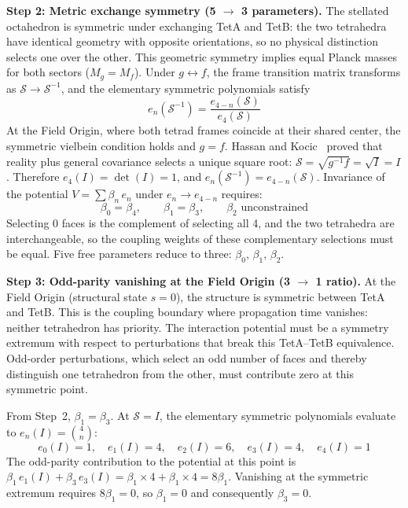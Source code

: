 \documentclass[aps,prd,preprint,superscriptaddress,showpacs,preprintnumbers,amsmath,amssymb,nofootinbib]{revtex4-2}
\begin{document}
\textbf{Step 2: Metric exchange symmetry (5 $\to$ 3 parameters).} The stellated octahedron is symmetric under exchanging TetA and TetB: the two tetrahedra have identical geometry with opposite orientations, so no physical distinction selects one over the other. This geometric symmetry implies equal Planck masses for both sectors ($M_g = M_f$). Under $g \leftrightarrow f$, the frame transition matrix transforms as $\mathcal{S} \to \mathcal{S}^{-1}$, and the elementary symmetric polynomials satisfy
\begin{equation}
e_n(\mathcal{S}^{-1}) = \frac{e_{4-n}(\mathcal{S})}{e_4(\mathcal{S})}
\end{equation}
At the Field Origin, where both tetrad frames coincide at their shared center, the symmetric vielbein condition holds and $g = f$. Hassan and Kocic~\cite{hassankocic2018} proved that reality plus general covariance selects a unique square root: $\mathcal{S} = \sqrt{g^{-1}f} = \sqrt{I} = I$. Therefore $e_4(I) = \det(I) = 1$, and $e_n(\mathcal{S}^{-1}) = e_{4-n}(\mathcal{S})$. Invariance of the potential $V = \sum \beta_n\,e_n$ under $e_n \to e_{4-n}$ requires:
\begin{equation}
\beta_0 = \beta_4, \qquad \beta_1 = \beta_3, \qquad \beta_2 \text{ unconstrained}
\end{equation}
Selecting 0 faces is the complement of selecting all 4, and the two tetrahedra are interchangeable, so the coupling weights of these complementary selections must be equal. Five free parameters reduce to three: $\beta_0$, $\beta_1$, $\beta_2$.

\textbf{Step 3: Odd-parity vanishing at the Field Origin (3 $\to$ 1 ratio).} At the Field Origin (structural state $s = 0$), the structure is symmetric between TetA and TetB. This is the coupling boundary where propagation time vanishes: neither tetrahedron has priority. The interaction potential must be a symmetry extremum with respect to perturbations that break this TetA--TetB equivalence. Odd-order perturbations, which select an odd number of faces and thereby distinguish one tetrahedron from the other, must contribute zero at this symmetric point.

From Step~2, $\beta_1 = \beta_3$. At $\mathcal{S} = I$, the elementary symmetric polynomials evaluate to $e_n(I) = \binom{4}{n}$:
\begin{equation}
e_0(I) = 1, \quad e_1(I) = 4, \quad e_2(I) = 6, \quad e_3(I) = 4, \quad e_4(I) = 1
\end{equation}
The odd-parity contribution to the potential at this point is $\beta_1\,e_1(I) + \beta_3\,e_3(I) = \beta_1 \times 4 + \beta_1 \times 4 = 8\beta_1$. Vanishing at the symmetric extremum requires $8\beta_1 = 0$, so $\beta_1 = 0$ and consequently $\beta_3 = 0$.
\end{document}
